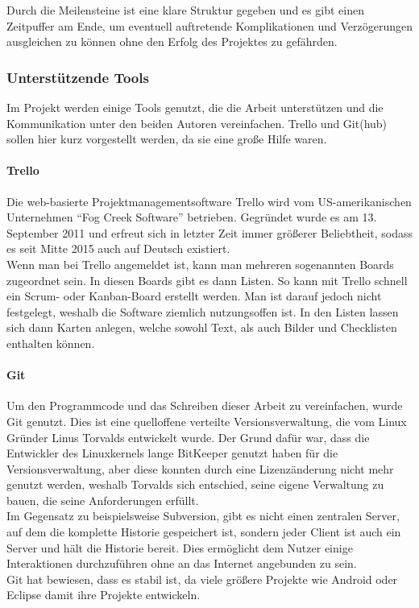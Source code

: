  Durch die Meilensteine ist eine klare Struktur gegeben und es gibt einen Zeitpuffer am Ende,
 um eventuell auftretende Komplikationen und Verzögerungen ausgleichen zu können ohne den
 Erfolg des Projektes zu gefährden.

 \subsubsection[Unterstützende Tools (Heumann)]{Unterstützende Tools}
  Im Projekt werden einige Tools genutzt, die die Arbeit unterstützen und die Kommunikation
  unter den beiden Autoren vereinfachen. Trello und Git(hub) sollen hier kurz vorgestellt werden,
  da sie eine große Hilfe waren.

  \paragraph{Trello}
  Die web-basierte Projekt\-management\-software Trello wird vom US-amerikanischen Unternehmen
  ``Fog Creek Software'' betrieben. Gegründet wurde es am 13. September 2011 und erfreut sich  in
  letzter Zeit immer größerer Beliebtheit, sodass es seit Mitte 2015 auch auf Deutsch existiert. \\
  Wenn man bei Trello angemeldet ist, kann man mehreren sogenannten Boards zugeordnet sein. In
  diesen Boards gibt es dann Listen. So kann mit Trello schnell ein Scrum- oder Kanban-Board
  erstellt werden. Man ist darauf jedoch nicht festgelegt, weshalb die Software ziemlich
  nutzungsoffen ist. In den Listen lassen sich dann Karten anlegen, welche sowohl Text, als auch
  Bilder und Checklisten enthalten können.

  \paragraph{Git}
  Um den Programmcode und das Schreiben dieser Arbeit zu vereinfachen, wurde Git genutzt. Dies ist
  eine quelloffene verteilte Versionsverwaltung, die vom Linux Gründer Linus Torvalds entwickelt
  wurde. Der Grund dafür war, dass die Entwickler des Linuxkernels lange BitKeeper genutzt haben
  für die Versionsverwaltung, aber diese konnten durch eine Lizenzänderung nicht mehr genutzt werden,
  weshalb Torvalds sich entschied, seine eigene Verwaltung zu bauen, die seine Anforderungen erfüllt. \\
  Im Gegensatz zu beispielsweise Subversion, gibt es nicht einen zentralen Server, auf dem die komplette
  Historie gespeichert ist, sondern jeder Client ist auch ein Server und hält die Historie bereit. Dies
  ermöglicht dem Nutzer einige Interaktionen durchzuführen ohne an das Internet angebunden zu sein. \\
  Git hat bewiesen, dass es stabil ist, da viele größere Projekte wie Android oder Eclipse damit ihre
  Projekte entwickeln.
